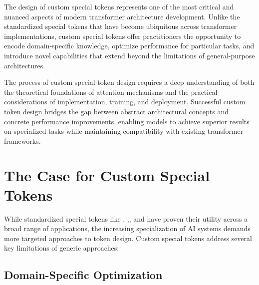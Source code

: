 
The design of custom special tokens represents one of the most critical and nuanced aspects of modern transformer architecture development. Unlike the standardized special tokens that have become ubiquitous across transformer implementations, custom special tokens offer practitioners the opportunity to encode domain-specific knowledge, optimize performance for particular tasks, and introduce novel capabilities that extend beyond the limitations of general-purpose architectures.
\begin{comment}
Feedback: This is a great opening. To make it even more exciting for the reader, you could frame it as moving from a user to a creator. For example: "In the previous parts, we explored the standard toolkit of special tokens. In this part, we move from being users of these tools to becoming architects. This chapter is about designing and forging your own special tokens to solve unique problems and push the boundaries of what transformers can do."
\end{comment}

The process of custom special token design requires a deep understanding of both the theoretical foundations of attention mechanisms and the practical considerations of implementation, training, and deployment. Successful custom token design bridges the gap between abstract architectural concepts and concrete performance improvements, enabling models to achieve superior results on specialized tasks while maintaining compatibility with existing transformer frameworks.

\section{The Case for Custom Special Tokens}

While standardized special tokens like \cls{}, \sep{}, and \mask{} have proven their utility across a broad range of applications, the increasing specialization of AI systems demands more targeted approaches to token design. Custom special tokens address several key limitations of generic approaches:

\subsection{Domain-Specific Optimization}

